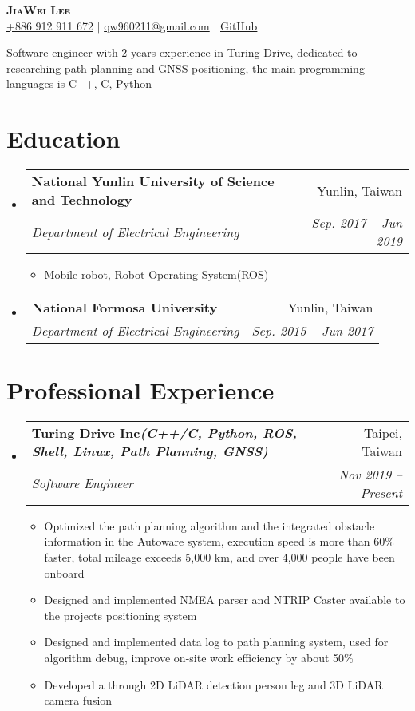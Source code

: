 \documentclass[letterpaper,11pt]{article}
\makeatletter
\newcommand{\resumeItem}[1]{
  \item\small{
    {#1 \vspace{-2pt}}
  }
}
\newcommand{\resumeSubheading}[4]{
  \vspace{-2pt}\item
    \begin{tabular*}{0.97\textwidth}[t]{l@{\extracolsep{\fill}}r}
      \textbf{#1} & #2 \\
      \textit{\small#3} & \textit{\small #4} \\
    \end{tabular*}\vspace{-7pt}
}
\newcommand{\resumeSubHeadingListStart}{\begin{itemize}[leftmargin=0.15in, label={}]}
\newcommand{\resumeSubHeadingListEnd}{\end{itemize}}
\newcommand{\resumeItemListStart}{\begin{itemize}}
\newcommand{\resumeItemListEnd}{\end{itemize}\vspace{-5pt}}
\makeatother
\begin{document}
\begin{center}
    \textbf{\Huge \scshape JiaWei Lee} \\ \vspace{3pt}
    \faMobile \hspace{.5pt} \href{tel:0912911672}{\color{blue}+886 912 911 672} $|$
    \faAt \hspace{.5pt} \href{mailto:qw960211@gmail.com}{\color{blue}qw960211@gmail.com} $|$
    \faGithub \hspace{.5pt} \href{https://github.com/EC404}{\color{blue}GitHub}
\end{center}

{Software engineer with 2 years experience in Turing-Drive, dedicated to researching
path planning and GNSS positioning, the main programming languages is C++, C, Python} \\

\section{\textbf{Education}}
  \vspace{3pt}
  \resumeSubHeadingListStart
    \resumeSubheading
      {National Yunlin University of Science and Technology}{Yunlin, Taiwan}
      {Department of Electrical Engineering}{Sep. 2017 -- Jun 2019}
      \resumeItemListStart
        \resumeItem{Mobile robot, Robot Operating System(ROS)}
      \resumeItemListEnd
    \resumeSubheading
      {National Formosa University}{Yunlin, Taiwan}
      {Department of Electrical Engineering}{Sep. 2015 -- Jun 2017}
  \resumeSubHeadingListEnd


\section{\textbf{Professional Experience}}
  \vspace{3pt}
  \resumeSubHeadingListStart

    \resumeSubheading 
      {\href{https://turing-drive.com/zh/home-zh/}{\color{blue}Turing Drive Inc}\emph{\scriptsize{(C++/C, Python, ROS, Shell, Linux, Path Planning, GNSS)}}}{Taipei, Taiwan}
      {Software Engineer}{Nov 2019 -- Present}
      \resumeItemListStart
      \resumeItem{Optimized the path planning algorithm and the integrated obstacle information in the Autoware system, execution speed is more than 60\% faster, total mileage exceeds 5,000 km, and over 4,000 people have been onboard}
      \resumeItem{Designed and implemented NMEA parser and NTRIP Caster available to the projects positioning system}
      \resumeItem{Designed and implemented data log to path planning system, used for algorithm debug, improve on-site work efficiency by about 50\%}
      \resumeItem{Developed a through 2D LiDAR detection person leg and 3D LiDAR camera fusion}
    \resumeItemListEnd
  \resumeSubHeadingListEnd
  
\end{document}
